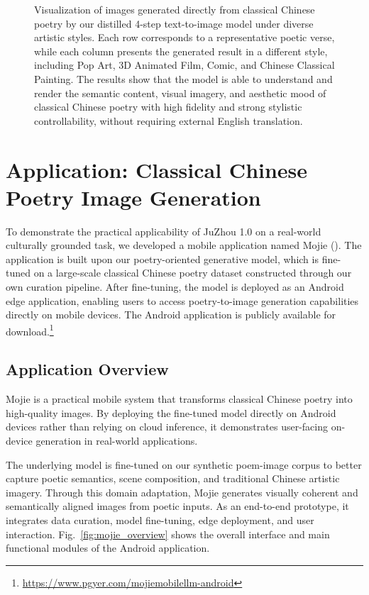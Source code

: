\begin{figure}[htbp]
\begin{tabular}{cccc}
\end{tabular}

\caption{Visualization of images generated directly from classical Chinese poetry by our distilled 4-step text-to-image model under diverse artistic styles. Each row corresponds to a representative poetic verse, while each column presents the generated result in a
different style, including Pop Art, 3D Animated Film, Comic, and Chinese Classical Painting. The results show that the model is able to understand and render the semantic content, visual imagery, and aesthetic mood of classical Chinese poetry with high fidelity and
strong stylistic controllability, without requiring external English translation.}
\label{fig:chinese-poetry}
\end{figure}

\section{Application: Classical Chinese Poetry Image Generation}

To demonstrate the practical applicability of JuZhou 1.0 on a real-world culturally grounded task, we developed a mobile application named Mojie (). The application is built upon our poetry-oriented generative model, which is fine-tuned on a large-scale classical Chinese poetry dataset constructed through our own curation pipeline. After fine-tuning, the model is deployed as an Android edge application, enabling users to access poetry-to-image generation capabilities directly on mobile devices. The Android application is publicly available for download.\footnote{\url{https://www.pgyer.com/mojiemobilellm-android}}

\subsection{Application Overview}

Mojie is a practical mobile system that transforms classical Chinese poetry into high-quality images. By deploying the fine-tuned model directly on Android devices rather than relying on cloud inference, it demonstrates user-facing on-device generation in real-world applications.

The underlying model is fine-tuned on our synthetic poem-image corpus to better capture poetic semantics, scene composition, and traditional Chinese artistic imagery. Through this domain adaptation, Mojie generates visually coherent and semantically aligned images from poetic inputs. As an end-to-end prototype, it integrates data curation, model fine-tuning, edge deployment, and user interaction. Fig.~\ref{fig:mojie_overview} shows the overall interface and main functional modules of the Android application.

